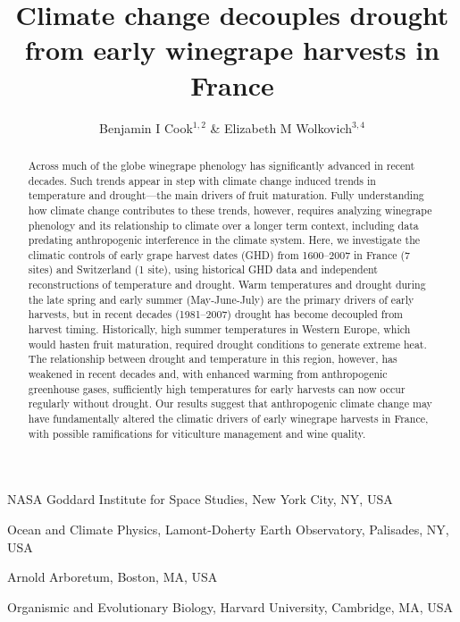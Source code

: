 \documentclass[final]{nature}
\title{Climate change decouples drought from early winegrape harvests in France} %
\author{Benjamin I Cook$^{1,2}$ \& Elizabeth M Wolkovich$^{3,4}$}
\begin{document}
\maketitle

\begin{affiliations}
 \item NASA Goddard Institute for Space Studies, New York City, NY, USA
 \item Ocean and Climate Physics, Lamont-Doherty Earth Observatory, Palisades, NY, USA
 \item Arnold Arboretum, Boston, MA, USA
 \item Organismic and Evolutionary Biology, Harvard University, Cambridge, MA, USA
\end{affiliations}

\begin{abstract}
Across much of the globe winegrape phenology has significantly advanced in recent decades\cite{Duchene:2005bd,Seguin2005,webb2011}. Such trends appear in step with climate change induced trends in temperature and drought---the main drivers of fruit maturation. Fully understanding how climate change contributes to these trends, however, requires analyzing winegrape phenology and its relationship to climate over a longer term context, including data predating anthropogenic interference in the climate system. Here, we investigate the climatic controls of early grape harvest dates (GHD) from 1600--2007 in France (7 sites) and Switzerland (1 site), using historical GHD data\cite{Daux2012} and independent reconstructions of temperature\cite{Luterbacher2004} and drought\cite{CookOWDA2015,Pauling2006}. Warm temperatures and drought during the late spring and early summer (May-June-July) are the primary drivers of early harvests, but in recent decades (1981--2007) drought has become decoupled from harvest timing. Historically, high summer temperatures in Western Europe, which would hasten fruit maturation, required drought conditions to generate extreme heat. The relationship between drought and temperature in this region, however, has weakened in recent decades and, with enhanced warming from anthropogenic greenhouse gases, sufficiently high temperatures for early harvests can now occur regularly without drought. Our results suggest that anthropogenic climate change may have fundamentally altered the climatic drivers of early winegrape harvests in France, with possible ramifications for viticulture management and wine quality. 
\end{abstract}
\end{document}
